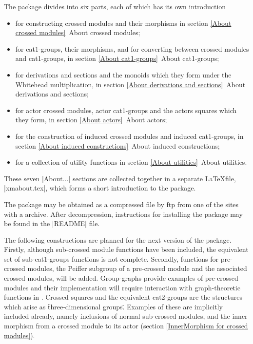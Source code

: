 The package divides into six parts, each of which has its own introduction\:
\begin{itemize}
\item for constructing crossed modules and their morphisms in section 
      \ref{About crossed modules}\:\ About crossed modules;
\item for cat1-groups, their morphisms, and for converting between
      crossed modules and cat1-groups, 
      in section \ref{About cat1-groups}\:\ About cat1-groups;
\item for derivations and sections and the monoids which they form
      under the Whitehead multiplication, in section
      \ref{About derivations and sections}\:\ About derivations and sections;
\item for actor crossed modules, actor cat1-groups and the actors squares
      which they form,  in section \ref{About actors}\:\ About actors;
\item for the construction of induced crossed modules
      and induced cat1-groups, in section 
      \ref{About induced constructions}\:\ About induced constructions;
\item for a collection of utility functions in section 
      \ref{About utilities}\:\ About utilities.
\end{itemize}

\noindent
These seven |About...| sections are collected together in a separate
\LaTeX file, |xmabout.tex|, which forms a short introduction to the package.

The  package may be obtained as  a compressed file by  ftp from one of
the sites with   a {\GAP} archive.  After  decompression, instructions
for installing the package may be found in the |README| file.

The following constructions are planned  for the  next version of  the
package.  Firstly,  although  sub-crossed  module functions  have been
included,  the  equivalent set  of  sub-cat1-groups  functions  is not
complete.  Secondly,  functions for  pre-crossed modules,  the Peiffer
subgroup of a pre-crossed module  and the associated crossed  modules,
will  be added.  Group-graphs  provide examples of pre-crossed modules
and their implementation will require interaction with graph-theoretic
functions in {\GAP}.  Crossed squares  and the equivalent  cat2-groups
are   the structures   which  arise as  \"three-dimensional  groups\".
Examples of  these are implicitly  included already, namely inclusions
of normal  sub-crossed modules, and the inner  morphism from a crossed
module to its actor (section \ref{InnerMorphism for crossed modules}).


